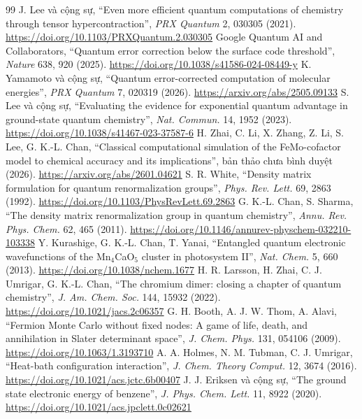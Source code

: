 {\begin{thebibliography}{99}
 J. Lee và cộng sự, ``Even more efficient quantum computations of chemistry through tensor hypercontraction'', \emph{PRX Quantum} 2, 030305 (2021). \url{https://doi.org/10.1103/PRXQuantum.2.030305}
 Google Quantum AI and Collaborators, ``Quantum error correction below the surface code threshold'', \emph{Nature} 638, 920 (2025). \url{https://doi.org/10.1038/s41586-024-08449-y}
 K. Yamamoto và cộng sự, ``Quantum error-corrected computation of molecular energies'', \emph{PRX Quantum} 7, 020319 (2026). \url{https://arxiv.org/abs/2505.09133}
 S. Lee và cộng sự, ``Evaluating the evidence for exponential quantum advantage in ground-state quantum chemistry'', \emph{Nat. Commun.} 14, 1952 (2023). \url{https://doi.org/10.1038/s41467-023-37587-6}
 H. Zhai, C. Li, X. Zhang, Z. Li, S. Lee, G. K.-L. Chan, ``Classical computational simulation of the FeMo-cofactor model to chemical accuracy and its implications'', bản thảo chưa bình duyệt (2026). \url{https://arxiv.org/abs/2601.04621}
 S. R. White, ``Density matrix formulation for quantum renormalization groups'', \emph{Phys. Rev. Lett.} 69, 2863 (1992). \url{https://doi.org/10.1103/PhysRevLett.69.2863}
 G. K.-L. Chan, S. Sharma, ``The density matrix renormalization group in quantum chemistry'', \emph{Annu. Rev. Phys. Chem.} 62, 465 (2011). \url{https://doi.org/10.1146/annurev-physchem-032210-103338}
 Y. Kurashige, G. K.-L. Chan, T. Yanai, ``Entangled quantum electronic wavefunctions of the Mn$_4$CaO$_5$ cluster in photosystem II'', \emph{Nat. Chem.} 5, 660 (2013). \url{https://doi.org/10.1038/nchem.1677}
 H. R. Larsson, H. Zhai, C. J. Umrigar, G. K.-L. Chan, ``The chromium dimer: closing a chapter of quantum chemistry'', \emph{J. Am. Chem. Soc.} 144, 15932 (2022). \url{https://doi.org/10.1021/jacs.2c06357}
 G. H. Booth, A. J. W. Thom, A. Alavi, ``Fermion Monte Carlo without fixed nodes: A game of life, death, and annihilation in Slater determinant space'', \emph{J. Chem. Phys.} 131, 054106 (2009). \url{https://doi.org/10.1063/1.3193710}
 A. A. Holmes, N. M. Tubman, C. J. Umrigar, ``Heat-bath configuration interaction'', \emph{J. Chem. Theory Comput.} 12, 3674 (2016). \url{https://doi.org/10.1021/acs.jctc.6b00407}
 J. J. Eriksen và cộng sự, ``The ground state electronic energy of benzene'', \emph{J. Phys. Chem. Lett.} 11, 8922 (2020). \url{https://doi.org/10.1021/acs.jpclett.0c02621}
\end{thebibliography}
}

